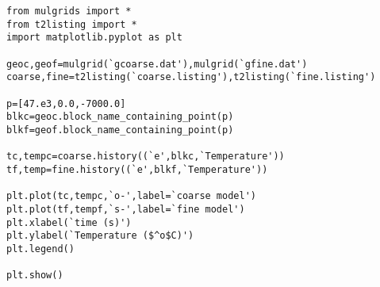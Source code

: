 \begin{verbatim}
from mulgrids import *
from t2listing import *
import matplotlib.pyplot as plt

geoc,geof=mulgrid(`gcoarse.dat'),mulgrid(`gfine.dat')
coarse,fine=t2listing(`coarse.listing'),t2listing(`fine.listing')

p=[47.e3,0.0,-7000.0]
blkc=geoc.block_name_containing_point(p)
blkf=geof.block_name_containing_point(p)

tc,tempc=coarse.history((`e',blkc,`Temperature'))
tf,temp=fine.history((`e',blkf,`Temperature'))

plt.plot(tc,tempc,`o-',label=`coarse model')
plt.plot(tf,tempf,`s-',label=`fine model')
plt.xlabel(`time (s)')
plt.ylabel(`Temperature ($^o$C)')
plt.legend()

plt.show()
\end{verbatim}

